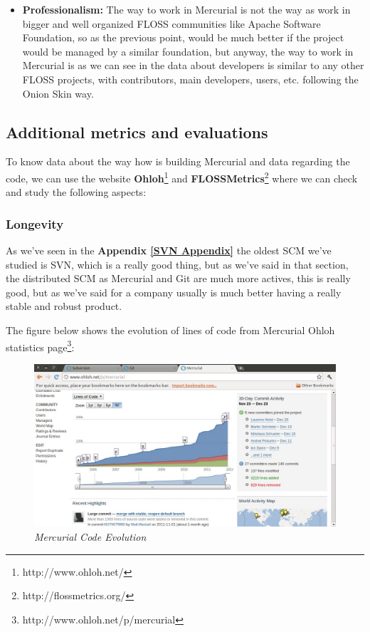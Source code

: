 \documentclass[a4paper,10pt]{article}
\begin{document}
\begin{itemize}
\item \textbf{Professionalism:}
The way to work in Mercurial is not the way as work in bigger and well organized
FLOSS communities like Apache Software Foundation, so as the previous point,
would be much better if the project would be managed by a similar foundation,
but anyway, the way to work in Mercurial is as we can see in the data about
developers is similar to any other FLOSS projects, with contributors, main
developers, users, etc. following the Onion Skin way.
\end{itemize}

\subsection{Additional metrics and evaluations}

To know data about the way how is building Mercurial and data regarding the
code, we can use the website \textbf{Ohloh}\footnote{http://www.ohloh.net/} and
\textbf{FLOSSMetrics}\footnote{http://flossmetrics.org/} where we can check and
study the following aspects:

\subsubsection{Longevity} \label{longevity_mercurial}

As we've seen in the \textbf{Appendix \ref{SVN Appendix}} the oldest SCM we've
studied is SVN, which is a really good thing, but as we've said in that
section, the distributed SCM as Mercurial and Git are much more actives, this
is really good, but as we've said for a company usually is much better having a
really stable and robust product.

The figure below shows the evolution of lines of code from Mercurial Ohloh
statistics page\footnote{http://www.ohloh.net/p/mercurial}:

\begin{figure}[H]
    \centering
    \includegraphics[width=15cm, keepaspectratio]{img/MERCURIALohloh.jpg}
    \caption{\textit{Mercurial Code Evolution}}
    \label{figure:mercurialcodeevolution2}
 \end{figure}
\end{document}
